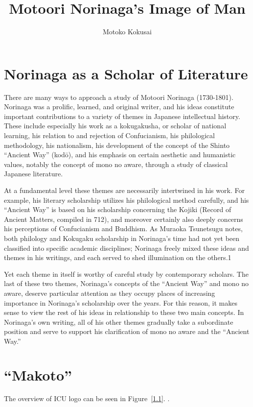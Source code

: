 \documentclass[12pt]{report}
\title{Motoori Norinaga’s Image of Man}
\author{Motoko Kokusai}
\date{}
\begin{document}

\doublespacing

\setcounter{tocdepth}{3}
\tableofcontents

\chapter{Norinaga as a Scholar of Literature}
There are many ways to approach a study of Motoori Norinaga (1730-1801). Norinaga was
a prolific, learned, and original writer, and his ideas constitute important contributions to a
variety of themes in Japanese intellectual history. These include especially his work as a
kokugakusha, or scholar of national learning, his relation to and rejection of Confucianism,
his philological methodology, his nationalism, his development of the concept of the Shinto
“Ancient Way” (kodō), and his emphasis on certain aesthetic and humanistic values, notably
the concept of mono no aware, through a study of classical Japanese literature.

At a fundamental level these themes are necessarily intertwined in his work. For
example, his literary scholarship utilizes his philological method carefully, and his “Ancient
Way” is based on his scholarship concerning the Kojiki (Record of Ancient Matters, compiled
in 712), and moreover certainly also deeply concerns his perceptions of Confucianism and
Buddhism. As Muraoka Tsunetsugu notes, both philology and Kokugaku scholarship in
Norinaga's time had not yet been classified into specific academic disciplines; Norinaga
freely mixed these ideas and themes in his writings, and each served to shed illumination on
the others.1

Yet each theme in itself is worthy of careful study by contemporary scholars. The last of
these two themes, Norinaga's concepts of the “Ancient Way” and mono no aware, deserve
particular attention as they occupy places of increasing importance in Norinaga's scholarship
over the years. For this reason, it makes sense to view the rest of his ideas in relationship to
these two main concepts. In Norinaga's own writing, all of his other themes gradually take
a subordinate position and serve to support his clarification of mono no aware and the
“Ancient Way.”


\chapter{“Makoto”}
The overview of ICU logo can be seen in Figure~\ref{1.1}.
\cite{Ishikawa1984}. 
\end{document}
